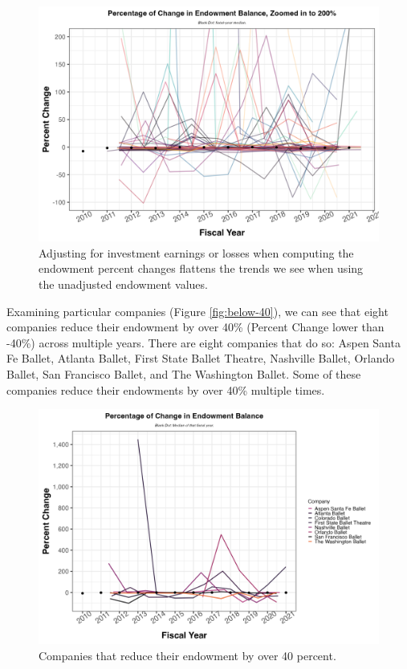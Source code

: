 \documentclass[Dance Data
Project,article,submit,moreauthors,pdftex]{mdpi}
\begin{document}
\begin{figure}[H]
\includegraphics[width=0.8\linewidth,]{../images/pc_endow_flat} \caption{\label{fig:flat} Adjusting for investment earnings or losses when computing the endowment percent changes flattens the trends we see when using the unadjusted endowment values.}\label{fig:flat}
\end{figure}

Examining particular companies (Figure \ref{fig:below-40}), we can see
that eight companies reduce their endowment by over 40\% (Percent Change
lower than -40\%) across multiple years. There are eight companies that
do so: Aspen Santa Fe Ballet, Atlanta Ballet, First State Ballet
Theatre, Nashville Ballet, Orlando Ballet, San Francisco Ballet, and The
Washington Ballet. Some of these companies reduce their endowments by
over 40\% multiple times.

\begin{figure}[H]
\includegraphics[width=0.8\linewidth,]{../images/pc_below_40} \caption{\label{fig:below-40} Companies that reduce their endowment by over 40 percent.}\label{fig:unnamed-chunk-6}
\end{figure}
\end{document}
